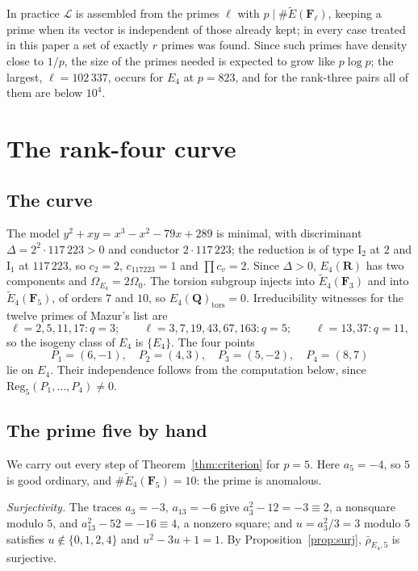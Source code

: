 \documentclass[11pt]{amsart}
\theoremstyle{definition}
\newcommand{\Q}{\mathbf{Q}}
\newcommand{\R}{\mathbf{R}}
\newcommand{\F}{\mathbf{F}}
\newcommand{\Reg}{\mathrm{Reg}}
\newcommand{\tors}{\mathrm{tors}}
\begin{document}
In practice $\mathcal L$ is assembled from the primes $\ell$ with $p\mid\#\tilde E(\F_\ell)$, keeping a prime when its vector is independent of those already kept; in every case treated in this paper a set of exactly $r$ primes was found. Since such primes have density close to $1/p$, the size of the primes needed is expected to grow like $p\log p$; the largest, $\ell=102\,337$, occurs for $E_4$ at $p=823$, and for the rank-three pairs all of them are below $10^4$.

\section{The rank-four curve}\label{sec:rank4}

\subsection{The curve}
The model $y^2+xy=x^3-x^2-79x+289$ is minimal, with discriminant $\Delta=2^2\cdot117\,223>0$ and conductor $2\cdot117\,223$; the reduction is of type $\mathrm{I}_2$ at $2$ and $\mathrm{I}_1$ at $117\,223$, so $c_2=2$, $c_{117223}=1$ and $\prod c_v=2$. Since $\Delta>0$, $E_4(\R)$ has two components and $\Omega_{E_4}=2\Omega_0$. The torsion subgroup injects into $\tilde E_4(\F_3)$ and into $\tilde E_4(\F_5)$, of orders $7$ and $10$, so $E_4(\Q)_\tors=0$. Irreducibility witnesses for the twelve primes of Mazur's list are
\[
\ell=2,5,11,17\colon q=3;\qquad \ell=3,7,19,43,67,163\colon q=5;\qquad \ell=13,37\colon q=11,
\]
so the isogeny class of $E_4$ is $\{E_4\}$. The four points
\[
P_1=(6,-1),\quad P_2=(4,3),\quad P_3=(5,-2),\quad P_4=(8,7)
\]
lie on $E_4$. Their independence follows from the computation below, since $\Reg_5(P_1,\dots,P_4)\neq0$.

\subsection{The prime five by hand}\label{ssec:p5}
We carry out every step of Theorem~\ref{thm:criterion} for $p=5$. Here $a_5=-4$, so $5$ is good ordinary, and $\#\tilde E_4(\F_5)=10$: the prime is anomalous.

\emph{Surjectivity.} The traces $a_3=-3$, $a_{13}=-6$ give $a_3^2-12=-3\equiv2$, a nonsquare modulo $5$, and $a_{13}^2-52=-16\equiv4$, a nonzero square; and $u=a_3^2/3=3$ modulo $5$ satisfies $u\notin\{0,1,2,4\}$ and $u^2-3u+1=1$. By Proposition~\ref{prop:surj}, $\bar\rho_{E_4,5}$ is surjective.
\end{document}
